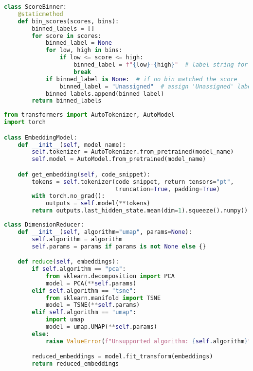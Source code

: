\begin{lstlisting}[language=Python, caption={\texttt{score\_binning.py}}, label={prco:score-binning}]
class ScoreBinner:
    @staticmethod
    def bin_scores(scores, bins):
        binned_labels = []
        for score in scores:
            binned_label = None
            for low, high in bins:
                if low <= score <= high:
                    binned_label = f"{low}-{high}"  # label string for bin
                    break
            if binned_label is None:  # if no bin matched the score
                binned_label = "Unassigned"  # assign 'Unassigned' label
            binned_labels.append(binned_label)
        return binned_labels
\end{lstlisting}

\begin{lstlisting}[language=Python, caption={\texttt{embedding\_model.py}}, label={prco:embedding-model}]
from transformers import AutoTokenizer, AutoModel
import torch

class EmbeddingModel:
    def __init__(self, model_name):
        self.tokenizer = AutoTokenizer.from_pretrained(model_name)
        self.model = AutoModel.from_pretrained(model_name)

    def get_embedding(self, code_snippet):
        tokens = self.tokenizer(code_snippet, return_tensors="pt", 
                                truncation=True, padding=True)
        with torch.no_grad():
            outputs = self.model(**tokens)
        return outputs.last_hidden_state.mean(dim=1).squeeze().numpy()
\end{lstlisting}

\begin{lstlisting}[language=Python, caption={\texttt{dimension\_reducer.py}}, label={prco:dimension-reducer}]
class DimensionReducer:
    def __init__(self, algorithm="umap", params=None):
        self.algorithm = algorithm
        self.params = params if params is not None else {}

    def reduce(self, embeddings):
        if self.algorithm == "pca":
            from sklearn.decomposition import PCA
            model = PCA(**self.params)
        elif self.algorithm == "tsne":
            from sklearn.manifold import TSNE
            model = TSNE(**self.params)
        elif self.algorithm == "umap":
            import umap
            model = umap.UMAP(**self.params)
        else:
            raise ValueError(f"Unsupported algorithm: {self.algorithm}")

        reduced_embeddings = model.fit_transform(embeddings)
        return reduced_embeddings
\end{lstlisting}

